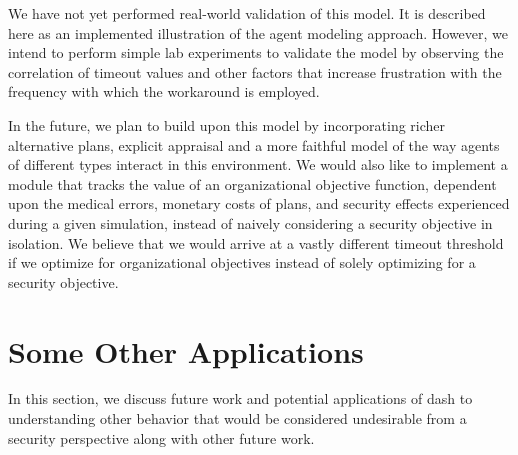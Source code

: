 \documentclass{acm_proc_article-sp}
\newcommand{\ignore}[1] {}
\begin{document}
We have not yet performed real-world validation of this model. It is
described here as an implemented illustration of the agent modeling
approach. However, we intend to perform simple lab experiments to
validate the model by observing the correlation of timeout values and
other factors that increase frustration with the frequency with which
the workaround is employed.

In the future, we plan to build upon this model by incorporating
richer alternative plans, explicit appraisal and a more faithful model
of the way agents of different types interact in this environment.  We
would also like to implement a module that tracks the value of an
organizational objective function, dependent upon the medical errors,
monetary costs of plans, and security effects experienced during a
given simulation, instead of naively considering a security objective
in isolation.  We believe that we would arrive at a vastly different
timeout threshold if we optimize for organizational objectives instead
of solely optimizing for a security objective.

\ignore{\textcolor{red}{
I swapped the paragraph given below with the previous  paragraph:
In the future, we plan to build upon this model by incorporating
richer alternative plans, explicit appraisal and a more faithful model
of the way agents of different types interact in this environment. It
would also be valuable to gather additional security and 
organizational statistics. Furthermore, we believe the model can be
used to explore an approach setting a timeout threshold that minimizes
some global objective function depending on variables such as
knowledge and ease of applying the workaround, monetary costs of
longer plans and of medical errors, frustration and other emotions,
user biases, etc. We believe such an approach would admit a vastly
different optimal solution than would be obtained by ignoring these
user aspects.
}}

\section{Some Other Applications}
\label{sec-future}

In this section, we discuss future work and potential applications of
{\sc dash} to understanding other behavior that would be considered
undesirable from a security perspective along with other future
work. 
\end{document}
